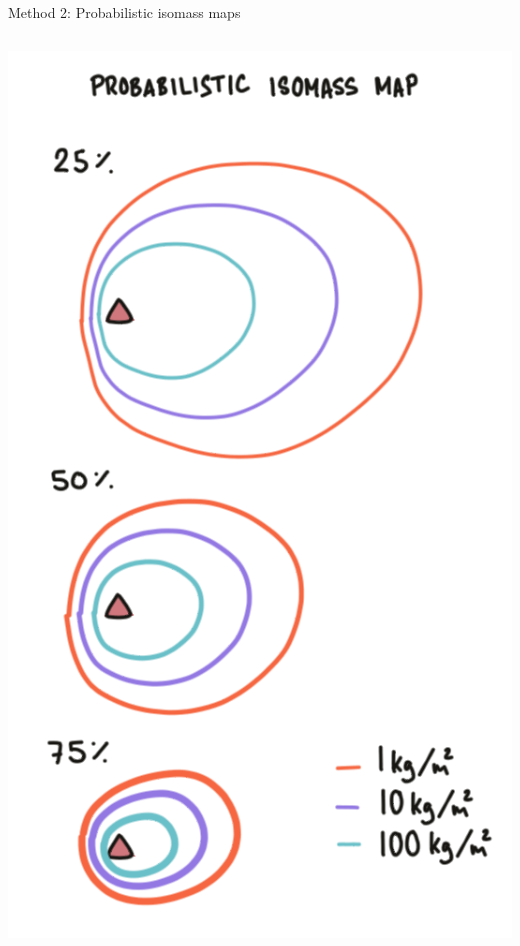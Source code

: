 \documentclass[10pt,aspectratio=169]{beamer}
\begin{document}
\begin{frame}{Method 2: Probabilistic isomass maps}
{\begin{columns}[T]
      \begin{column}{0.35\textwidth}	
        \centering \includegraphics[width=.9\textwidth]{img/isomass_map.png}
      \end{column}
    \end{columns}
  }
\end{frame}
\end{document}
